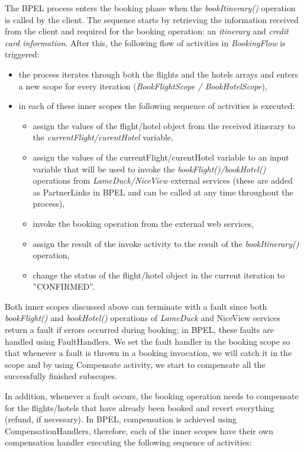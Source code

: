 The BPEL process enters the booking phase when the \textit{bookItinerary()} operation is called by the client. The sequence starts by retrieving the information received from the client and required for the booking operation: an \textit{itinerary} and \textit{credit card information}.  After this, the following flow of activities in \textit{BookingFlow} is triggered:
\begin{itemize}
\item the process iterates through both the flights and the hotels arrays and enters a new scope for every iteration (\textit{BookFlightScope / BookHotelScope}),
\item in each of these inner scopes the following sequence of activities is executed:

\begin{itemize}
\item assign the values of the flight/hotel object from the received itinerary to the \textit{currentFlight/curentHotel} variable,
\item assign the values of the {currentFlight/curentHotel} variable to an input variable that will be used to invoke the \textit{bookFlight()/bookHotel()} operations from \textit{LameDuck/NiceView} external services (these are added as PartnerLinks in BPEL and can be called at any time throughout the process),
\item invoke the booking operation from the external web services,
\item assign the result of the invoke activity to the result of the \textit{bookItinerary()} operation,
\item change the status of the flight/hotel object in the current iteration to ''CONFIRMED''.
\end{itemize}

\end{itemize}

Both inner scopes discussed above can terminate with a fault since both \textit{bookFlight()} and \textit{bookHotel()} operations of \textit{LameDuck} and NiceView services return a fault if errors occurred during booking; in BPEL, these faults are handled using FaultHandlers. We set the fault handler in the booking scope so that whenever a fault is thrown in a booking invocation, we will catch it in the scope and by using Compensate activity, we start to compensate all the successfully finished subscopes.

In addition, whenever a fault occurs, the booking operation needs to compensate for the flights/hotels that have already been booked and revert everything (refund, if necessary). In BPEL, compensation is achieved using CompensationHandlers, therefore, each of the inner scopes have their own compensation handler executing the following sequence of activities:

